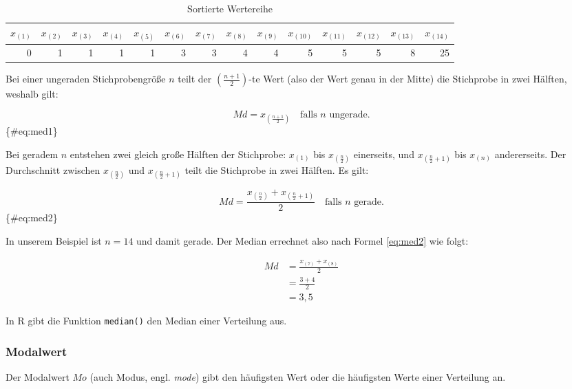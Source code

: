 \documentclass[
  ngerman,
]{article}
\begin{document}
\begin{table}[!h]

\caption{\label{tab:sort}Sortierte Wertereihe}
\centering
\begin{tabular}[t]{rrrrrrrrrrrrrr}
\toprule
$x_{(1)}$ & $x_{(2)}$ & $x_{(3)}$ & $x_{(4)}$ & $x_{(5)}$ & $x_{(6)}$ & $x_{(7)}$ & $x_{(8)}$ & $x_{(9)}$ & $x_{(10)}$ & $x_{(11)}$ & $x_{(12)}$ & $x_{(13)}$ & $x_{(14)}$\\
\midrule
0 & 1 & 1 & 1 & 1 & 3 & 3 & 4 & 4 & 5 & 5 & 5 & 8 & 25\\
\bottomrule
\end{tabular}
\end{table}

Bei einer ungeraden Stichprobengröße \(n\) teilt der \((\frac{n+1}{2})\)-te Wert (also der Wert genau in der Mitte) die Stichprobe in zwei Hälften, weshalb gilt:

\[
  \mathit{Md} = x_{(\frac{n+1}{2})} \quad \text{falls }n\text{ ungerade.}
\]\{\#eq:med1\}

Bei geradem \(n\) entstehen zwei gleich große Hälften der Stichprobe: \(x_{(1)}\) bis \(x_{(\frac{n}{2})}\) einerseits, und \(x_{(\frac{n}{2}+1)}\) bis \(x_{(n)}\) andererseits. Der Durchschnitt zwischen \(x_{(\frac{n}{2})}\) und \(x_{(\frac{n}{2}+1)}\) teilt die Stichprobe in zwei Hälften. Es gilt:

\[
  \mathit{Md} = \frac{x_{(\frac{n}{2})} + x_{(\frac{n}{2}+1)}}{2} \quad \text{falls } n \text{ gerade.}
\]\{\#eq:med2\}

In unserem Beispiel ist \(n=14\) und damit gerade. Der Median errechnet also nach Formel \ref{eq:med2} wie folgt:

\[
  \begin{aligned}
    \mathit{Md} & = \frac{x_{(7)} + x_{(8)}}{2} \\[4pt]
                & = \frac{3 + 4}{2} \\[4pt]
                & = 3,5
  \end{aligned}
\]

\begin{rtip}
In R gibt die Funktion {\tt median()} den Median einer Verteilung aus.
\end{rtip}

\hypertarget{modalwert}{%
\subsubsection{Modalwert}\label{modalwert}}

Der Modalwert \(\mathit{Mo}\) (auch Modus, engl. \emph{mode}) gibt den häufigsten Wert oder die häufigsten Werte einer Verteilung an.
\end{document}
